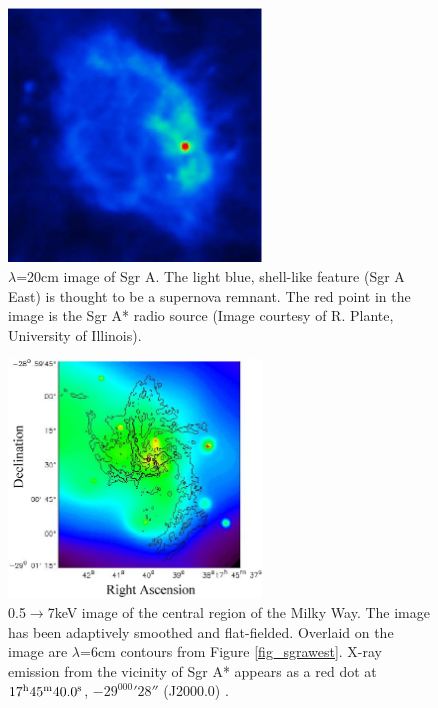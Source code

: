 \begin{figure}[p]
	\begin{center}
	\includegraphics[angle=0,width=0.6\textwidth]{eps/sgraeast.eps}
	\caption{$\lambda$=20cm image of Sgr A. The light blue, shell-like feature (Sgr A East) is thought to be a supernova remnant. The
	red point in the image is the Sgr A* radio source (Image courtesy of R. Plante, University of Illinois).}
	\label{fig_sgraeast}
	\end{center}
\end{figure}
\begin{figure}[p]
	\begin{center}
	\includegraphics[angle=0,width=0.6\textwidth]{eps/xray.eps}
	\caption{0.5$\rightarrow$7keV image of the central region of the Milky Way. The image has been adaptively smoothed and flat-fielded.
	Overlaid on the image are $\lambda$=6cm contours from Figure \ref{fig_sgrawest}. X-ray emission from the vicinity of Sgr A*
	appears as a red dot at $\rm 17^h45^m40.0^s$, $-29^000'28''$ (J2000.0) \cite{ref_baganoffsubmit}.}
	\label{fig_xray}
	\end{center}
\end{figure}
